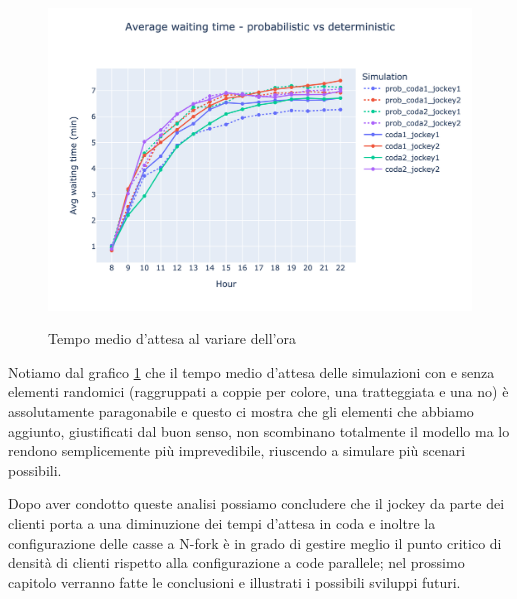 \begin{figure}[H]
	\centering
	\includegraphics[width=12cm]{"images/results/avg_wt_prob.png"}
	\label{fig:avg_wt_prob}
	\caption{Tempo medio d'attesa al variare dell'ora}
\end{figure}

Notiamo dal grafico \ref{fig:avg_wt_prob} che il tempo medio d'attesa delle simulazioni con e senza elementi randomici (raggruppati a coppie per colore, una tratteggiata e una no) è assolutamente paragonabile e questo ci mostra che gli elementi che abbiamo aggiunto, giustificati dal buon senso, non scombinano totalmente il modello ma lo rendono semplicemente più imprevedibile, riuscendo a simulare più scenari possibili.

\vspace*{1\baselineskip}

Dopo aver condotto queste analisi possiamo concludere che il jockey da parte dei clienti porta a una diminuzione dei tempi d'attesa in coda e inoltre la configurazione delle casse a N-fork è in grado di gestire meglio il punto critico di densità di clienti rispetto alla configurazione a code parallele; nel prossimo capitolo verranno fatte le conclusioni e illustrati i possibili sviluppi futuri.
